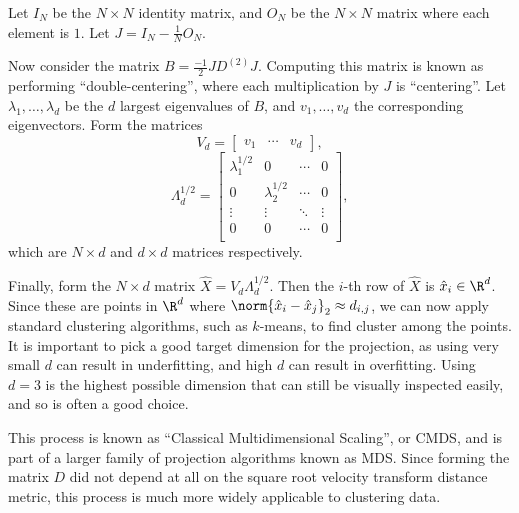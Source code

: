 \documentclass[12pt]{article}
\begin{document}
Let $I_N$ be the $N \times N$ identity matrix, and $O_N$ be the $N \times N$ matrix where each element is $1$. Let $J = I_N - \frac{1}{N}O_N$.

Now consider the matrix $B = \frac{-1}{2}JD^{(2)}J$. Computing this matrix is known as performing ``double-centering'', where each multiplication by $J$ is ``centering''. Let $\lambda_1, \ldots, \lambda_d$ be the $d$ largest eigenvalues of $B$, and $v_1, \ldots, v_d$ the corresponding eigenvectors. Form the matrices
\[V_d = \begin{bmatrix}
    v_1 & \cdots & v_d
\end{bmatrix},\]
\[\Lambda_d^{1/2} = \begin{bmatrix}
    \lambda_1^{1/2} & 0 & \cdots & 0 \\
    0 & \lambda_2^{1/2} & \cdots & 0 \\
    \vdots & \vdots & \ddots & \vdots \\
    0 & 0 & \cdots & 0 \\
\end{bmatrix},\] which are $N \times d$ and $d \times d$ matrices respectively.

Finally, form the $N \times d$ matrix $\hat{X} = V_d\Lambda_d^{1/2}$. Then the $i$-th row of $\hat{X}$ is $\hat{x}_i \in \R^d$. Since these are points in $\R^d$ where $\norm{\hat{x}_i - \hat{x}_j}_2 \approx d_{i, j}$, we can now apply standard clustering algorithms, such as $k$-means, to find cluster among the points. It is important to pick a good target dimension for the projection, as using very small $d$ can result in underfitting, and high $d$ can result in overfitting. Using $d=3$ is the highest possible dimension that can still be visually inspected easily, and so is often a good choice.

This process is known as ``Classical Multidimensional Scaling'', or CMDS, and is part of a larger family of projection algorithms known as MDS. Since forming the matrix $D$ did not depend at all on the square root velocity transform distance metric, this process is much more widely applicable to clustering data.
\end{document}
